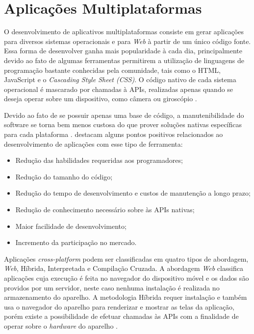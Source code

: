 \section{Aplicações Multiplataformas}

O desenvolvimento de aplicativos multiplataformas consiste em gerar aplicações para diversos sistemas operacionais e para \textit{Web} à partir de um único código fonte. Essa forma de desenvolver ganha mais popularidade à cada dia, principalmente devido ao fato de algumas ferramentas permitirem a utilização de linguagens de programação bastante conhecidas pela comunidade, tais como o HTML, JavaScript e o \textit{Cascading Style Sheet (CSS)}. O código nativo de cada sistema operacional é mascarado por chamadas à APIs, realizadas apenas quando se deseja operar sobre um dispositivo, como câmera ou giroscópio \cite{raj2012study, palmieri2012comparison, dalmasso2013survey}.

Devido ao fato de se possuir apenas uma base de código, a manutenibilidade do software se torna bem menos custosa do que prover soluções nativas específicas para cada plataforma \cite{raj2012study}.  destacam alguns pontos positivos relacionados ao desenvolvimento de aplicações com esse tipo de ferramenta:

\begin{itemize}
\item Redução das habilidades requeridas aos programadores;
\item Redução do tamanho do código;
\item Redução do tempo de desenvolvimento e custos de manutenção a longo prazo;
\item Redução de conhecimento necessário sobre às APIs nativas;
\item Maior facilidade de desenvolvimento;
\item Incremento da participação no mercado.
\end{itemize}


Aplicações \textit{cross-platform} podem ser classificadas em quatro tipos de abordagem, \textit{Web}, Híbrida, Interpretada e Compilação Cruzada. A abordagem \textit{Web} classifica aplicações cuja execução é feita no navegador do dispositivo móvel e os dados são providos por um servidor, neste caso nenhuma instalação é realizada no armazenamento do aparelho. A metodologia Híbrida requer instalação e também usa o navegador do aparelho para renderizar e mostrar as telas da aplicação, porém existe a possibilidade de efetuar chamadas às APIs com a finalidade de operar sobre o \textit{hardware} do aparelho \cite{raj2012study, dalmasso2013survey}.


